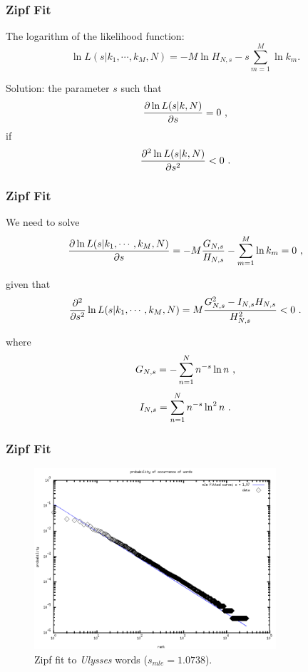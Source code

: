 \documentclass[notes]{beamer}
\begin{document}
\frame
{
  \frametitle{Zipf Fit}
  The logarithm of the likelihood function:
  \begin{equation}
  \ln L(s|k_1,\cdots,k_M,N) = -M \ln H_{N,s} - s \sum_{m=1}^{M} \ln k_m .
  \end{equation}

  Solution:
  the parameter $s$ such that
  \begin{equation}
  \label{eq:dervloglikelihood}
  \frac{\partial \ln L(s|k,N)}{\partial s} = 0  \textmd{ ,}
  \end{equation}
  if
  \begin{equation}
  \frac{\partial^2 \ln L(s|k,N)}{\partial s^2} < 0 \textmd{ .}
  \end{equation}
}


\frame
{
  \frametitle{Zipf Fit}
  We need to solve
  \begin{equation}
  \frac{\partial \ln L(s|k_1,\cdots,k_M,N)}{\partial s}  = -M \frac{G_{N,s}}{H_{N,s}} - \sum_{m=1}^{M} \ln k_m  = 0 \textmd{ ,}
  \end{equation}

  given that
  \begin{equation}
  \frac{\partial^2}{\partial s^2} \ln L(s|k_1,\cdots,k_M,N) = M \frac{  G_{N,s}^2 - I_{N,s} H_{N,s}  } {H_{N,s}^2} < 0 \textmd{ .}
  \end{equation}

  where
  \begin{equation}
  G_{N,s} = - \sum_{n=1}^{N} n^{-s} \ln n  \textmd{ ,}
  \end{equation}
  \begin{equation}
  I_{N,s} = \sum_{n=1}^{N} n^{-s} \ln^2 n \textmd{ .}
  \end{equation}
}



\frame
{
  \frametitle{Zipf Fit}
  \vspace{-0.3cm}
  \begin{figure}[h]
  \centering
  \includegraphics[width=0.8\textwidth]{imagespresentation/ulysses_fittedcurve_words_probabilities300a.png}
  \caption{Zipf fit to \emph{Ulysses} words ($s_{mle}=1.0738$).}
  \end{figure}
}
\end{document}
